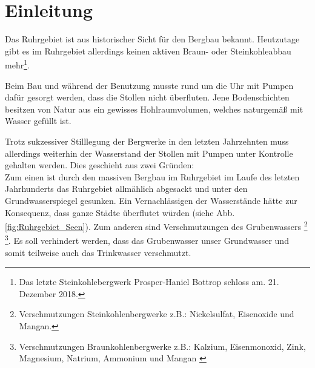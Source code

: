 \chapter{Einleitung}


Das Ruhrgebiet ist aus historischer Sicht für den Bergbau bekannt.
Heutzutage gibt es im Ruhrgebiet allerdings keinen aktiven Braun- oder Steinkohleabbau
mehr\footnote{Das letzte Steinkohlebergwerk Prosper-Haniel Bottrop schloss am.
21. Dezember 2018.}.

Beim Bau und während der Benutzung musste rund um die Uhr mit Pumpen dafür gesorgt werden,
dass die Stollen nicht überfluten. Jene Bodenschichten besitzen von Natur aus ein 
gewisses Hohlraumvolumen, welches naturgemäß mit Wasser gefüllt ist.

Trotz sukzessiver Stilllegung der Bergwerke in den letzten Jahrzehnten
muss allerdings weiterhin der Wasserstand der Stollen mit Pumpen unter Kontrolle gehalten werden.
Dies geschieht aus zwei Gründen: \\
Zum einen ist durch den massiven Bergbau im Ruhrgebiet im Laufe des letzten Jahrhunderts 
das Ruhrgebiet allmählich abgesackt und unter den Grundwasserspiegel gesunken. 
Ein Vernachlässigen der Wasserstände hätte zur Konsequenz, dass ganze Städte überflutet würden 
(siehe Abb. \ref{fig:Ruhrgebiet_Seen}). Zum anderen sind Verschmutzungen des Grubenwassers
\footnote{Verschmutzungen Steinkohlenbergwerke z.B.: Nickelsulfat, Eisenoxide und Mangan.\cite{grubenwasser}}
\footnote{Verschmutzungen Braunkohlenbergwerke z.B.: Kalzium, Eisenmonoxid, Zink, Magnesium,
 Natrium, Ammonium und Mangan \cite{grubenwasser}}.
Es soll verhindert werden, dass das Grubenwasser unser Grundwasser
und somit teilweise auch das Trinkwasser verschmutzt.


